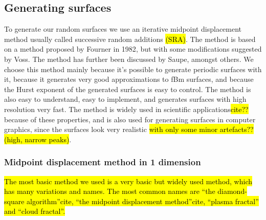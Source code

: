 \subsection{Generating surfaces}

To generate our random surfaces we use an iterative midpoint displacement method usually called successive random additions \hl{(SRA)}. The method is based on a method proposed by Fourner in 1982\cite{fournier1982computer}, but with some modifications suggested by Voss\cite{voss1985random, voss1988fractals}. The method has further been discussed by Saupe\cite{saupe1988algorithms}, amongst others. We choose this method mainly because it's possible to generate periodic surfaces with it, because it generates very good approximations to fBm surfaces\cite{zhou2005comparison}, and because the Hurst exponent of the generated surfaces is easy to control. The method is also easy to understand, easy to implement, and generates surfaces with high resolution very fast. The method is widely used in scientific applications\hl{cite??} because of these properties, and is also used for generating surfaces in computer graphics, since the surfaces look very realistic \hl{with only some minor artefacts?? (high, narrow peaks)}.

\subsubsection{Midpoint displacement method in 1 dimension}
\hl{The most basic method we used is a very basic but widely used method, which has many variations and names. The most common names are ``the diamond-square algorithm''\hl{cite}, ``the midpoint displacement method''\hl{cite}, ``plasma fractal'' and ``cloud fractal''.}

